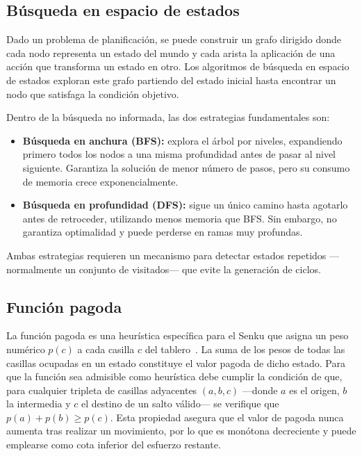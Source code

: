 \documentclass[conference,a4paper]{IEEEtran}
\begin{document}
\subsection{Búsqueda en espacio de estados}

Dado un problema de planificación, se puede construir un grafo dirigido donde
cada nodo representa un estado del mundo y cada arista la aplicación de una
acción que transforma un estado en otro. Los algoritmos de búsqueda en espacio
de estados exploran este grafo partiendo del estado inicial hasta encontrar un
nodo que satisfaga la condición objetivo.

Dentro de la búsqueda no informada, las dos estrategias fundamentales son:
\begin{itemize}
  \item \textbf{Búsqueda en anchura (BFS):} explora el árbol por niveles,
    expandiendo primero todos los nodos a una misma profundidad antes de pasar
    al nivel siguiente. Garantiza la solución de menor número de pasos, pero
    su consumo de memoria crece exponencialmente.
  \item \textbf{Búsqueda en profundidad (DFS):} sigue un único camino hasta
    agotarlo antes de retroceder, utilizando menos memoria que BFS. Sin
    embargo, no garantiza optimalidad y puede perderse en ramas muy profundas.
\end{itemize}
Ambas estrategias requieren un mecanismo para detectar estados repetidos —
normalmente un conjunto de visitados— que evite la generación de ciclos.

\subsection{Función pagoda}

La función pagoda es una heurística específica para el Senku que asigna un
peso numérico $p(c)$ a cada casilla $c$ del tablero~\cite{beasley-peg-solitaire}.
La suma de los pesos de todas las casillas ocupadas en un estado constituye el
valor pagoda de dicho estado. Para que la función sea admisible como heurística
debe cumplir la condición de que, para cualquier tripleta de casillas adyacentes
$(a, b, c)$ —donde $a$ es el origen, $b$ la intermedia y $c$ el destino de un
salto válido— se verifique que $p(a) + p(b) \geq p(c)$. Esta propiedad asegura
que el valor de pagoda nunca aumenta tras realizar un movimiento, por lo que es
monótona decreciente y puede emplearse como cota inferior del esfuerzo restante.
\end{document}
